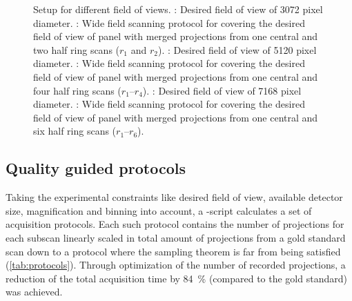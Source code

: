 \begin{figure}[p]
	\caption[Setup for different field of views]{Setup for different field of views. %
		: Desired field of view of 3072 pixel diameter. %
		: Wide field scanning protocol for covering the desired field of view of panel  with merged projections from one central and two half ring scans ($r_{1}$ and $r_{2}$). %
		: Desired field of view of 5120 pixel diameter. %
		: Wide field scanning protocol for covering the desired field of view of panel  with merged projections from one central and four half ring scans ($r_{1}$--$r_{4}$). %
		: Desired field of view of 7168 pixel diameter. %
		: Wide field scanning protocol for covering the desired field of view of panel  with merged projections from one central and six half ring scans ($r_{1}$--$r_{6}$).}%
	\label{fig:SubScan-Setup}
\end{figure}%

\subsection{Quality guided protocols}\label{sec:quality guided protocols}
Taking the experimental constraints like desired field of view, available detector size, magnification and binning into account, a -script calculates a set of acquisition protocols. Each such protocol contains the number of projections for each subscan linearly scaled in total amount of projections from a gold standard scan down to a protocol where the sampling theorem is far from being satisfied (\autoref{tab:protocols}). Through optimization of the number of recorded projections, a reduction of the total acquisition time by \SI{84}{\percent} (compared to the gold standard) was achieved.

